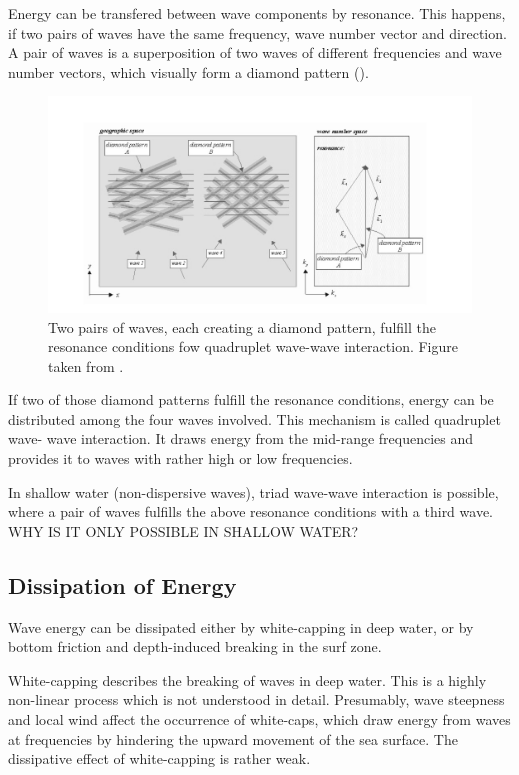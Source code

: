 Energy can be transfered between wave components by resonance. This happens, if 
two pairs of waves have the same frequency, wave number vector and direction. A 
pair of waves is a superposition of two waves of different frequencies and wave 
number vectors, which visually form a diamond pattern ().
\begin{figure}[ht]
 \includegraphics[width=15cm]{bilder/diamond.png}
 \caption{Two pairs of waves, each creating a diamond pattern, fulfill the 
resonance conditions fow quadruplet wave-wave interaction. Figure taken from 
\cite{holthuijsen2007}. \label{diamond}}
\end{figure}

If two of those diamond patterns fulfill the resonance conditions, energy can 
be distributed among the four waves involved. This mechanism is called 
quadruplet wave- wave interaction. It draws energy from the mid-range 
frequencies and provides it to waves with rather high or low frequencies. 

In shallow water (non-dispersive waves), triad wave-wave interaction is 
possible, where a pair of waves fulfills the above resonance conditions with a 
third wave. WHY IS IT ONLY POSSIBLE IN SHALLOW WATER?

\subsection{Dissipation of Energy}

Wave energy can be dissipated either by white-capping in deep 
water, or by bottom friction and depth-induced breaking in the surf zone. 

White-capping describes the breaking of waves in deep water. This is a 
highly non-linear process which is not understood in detail. Presumably, wave 
steepness and local wind affect the occurrence of white-caps, which draw energy 
from waves at frequencies by hindering the upward movement of the sea surface. 
The dissipative effect of white-capping is rather weak.

